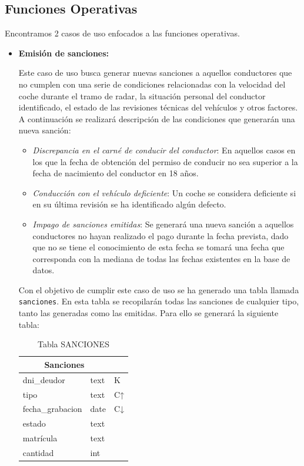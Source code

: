 \documentclass[]{article}
\begin{document}
\subsection{Funciones Operativas}
\label{subsec:funciones_operativas}

Encontramos 2 casos de uso enfocados a las funciones operativas.
\begin{itemize}
    \item \textbf{Emisión de sanciones:}
    
    Este caso de uso busca generar nuevas sanciones a aquellos conductores que no cumplen con una serie de condiciones relacionadas con la velocidad del coche durante el tramo de radar, la situación personal del conductor identificado, el estado de las revisiones técnicas del vehículos y otros factores.
    A continuación se realizará descripción de las condiciones que generarán una nueva sanción:
    \begin{itemize}
        \item \textit{Discrepancia en el carné de conducir del conductor}: En aquellos casos en los que la fecha de obtención del permiso de conducir no sea superior a la fecha de nacimiento del conductor en 18 años.
        \item \textit{Conducción con el vehículo deficiente}: Un coche se considera deficiente si en su última revisión se ha identificado algún defecto. 
        \item \textit{Impago de sanciones emitidas}: Se generará una nueva sanción a aquellos conductores no hayan realizado el pago durante la fecha prevista, dado que no se tiene el conocimiento de esta fecha se tomará una fecha que corresponda con la mediana de todas las fechas existentes en la base de datos.
    \end{itemize}

    Con el objetivo de cumplir este caso de uso se ha generado una tabla llamada \texttt{sanciones}. En esta tabla se recopilarán todas las sanciones de cualquier tipo, tanto las generadas como las emitidas. Para ello se generará la siguiente tabla:
\begin{table}[H]
    \centering
    \begin{tabular}{lll} 
        \toprule
        \multicolumn{2}{c}{\large\textbf{Sanciones}} \\ 
        \midrule
        dni\_deudor    & text & K \\
        tipo           & text & C↑\\
        fecha\_grabacion & date & C↓\\
        estado & text &\\
        matrícula & text &\\
        cantidad & int &\\
        \bottomrule
    \end{tabular}
    \caption {Tabla SANCIONES}
 \end{table}


\end{itemize}
\end{document}
